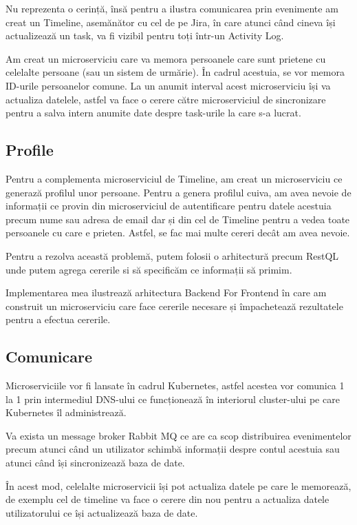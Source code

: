Nu reprezenta o cerință, însă pentru a ilustra comunicarea prin evenimente am creat un Timeline, asemănător cu cel
de pe Jira, în care atunci când cineva își actualizează un task, va fi vizibil pentru toți într-un Activity Log.

Am creat un microserviciu care va memora persoanele care sunt prietene cu celelalte persoane (sau un sistem de urmărie).
În cadrul acestuia, se vor memora ID-urile persoanelor comune. La un anumit interval acest microserviciu își va actualiza datelele,
astfel va face o cerere către microserviciul de sincronizare pentru a salva intern anumite date despre task-urile la care s-a lucrat.

\subsection{Profile}

Pentru a complementa microserviciul de Timeline, am creat un microserviciu ce generază profilul unor persoane.
Pentru a genera profilul cuiva, am avea nevoie de informații ce provin din microserviciul de autentificare pentru
datele acestuia precum nume sau adresa de email dar și din cel de Timeline pentru a vedea toate persoanele
cu care e prieten. Astfel, se fac mai multe cereri decât am avea nevoie.

Pentru a rezolva această problemă, putem folosii o arhitectură precum RestQL unde
putem agrega cererile si să specificăm ce informații să primim.

Implementarea mea ilustrează arhitectura Backend For Frontend în care am construit un microserviciu
care face cererile necesare și împachetează rezultatele pentru a efectua cererile.

\subsection{Comunicare}

Microserviciile vor fi lansate în cadrul Kubernetes, astfel acestea vor comunica 1 la 1 prin intermediul
DNS-ului ce funcționează în interiorul cluster-ului pe care Kubernetes îl administrează.

Va exista un message broker Rabbit MQ ce are ca scop distribuirea evenimentelor precum atunci când
un utilizator schimbă informații despre contul acestuia sau atunci când își sincronizează baza de date.

În acest mod, celelalte microservicii își pot actualiza datele pe care le memorează,
de exemplu cel de timeline va face o cerere din nou pentru a actualiza datele utilizatorului ce își actualizează baza de date.


